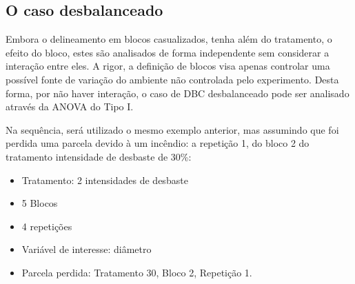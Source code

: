 \documentclass[
]{article}
\providecommand{\tightlist}{%
  \setlength{\itemsep}{0pt}\setlength{\parskip}{0pt}}
\begin{document}
\hypertarget{o-caso-desbalanceado-1}{%
\subsection{O caso desbalanceado}\label{o-caso-desbalanceado-1}}

Embora o delineamento em blocos casualizados, tenha além do tratamento, o efeito do bloco, estes são analisados de forma independente sem considerar a interação entre eles. A rigor, a definição de blocos visa apenas controlar uma possível fonte de variação do ambiente não controlada pelo experimento. Desta forma, por não haver interação, o caso de DBC desbalanceado pode ser analisado através da ANOVA do Tipo I.

Na sequência, será utilizado o mesmo exemplo anterior, mas assumindo que foi perdida uma parcela devido à um incêndio: a repetição 1, do bloco 2 do tratamento intensidade de desbaste de 30\%:

\begin{itemize}
\tightlist
\item
  Tratamento: 2 intensidades de desbaste
\item
  5 Blocos
\item
  4 repetições
\item
  Variável de interesse: diâmetro
\item
  Parcela perdida: Tratamento 30, Bloco 2, Repetição 1.
\end{itemize}
\end{document}
